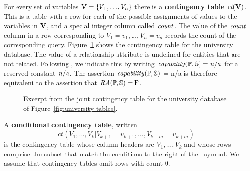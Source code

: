 \documentclass{sig-alternate-2013}
\newcommand{\ct}{\mathit{ct}}
\begin{document}
For every set of variables $\set{V} = \{\V_{1}$,$\ldots,\V_{n} \}$ there is a \textbf{contingency table} $\ct(\set{V})$. %
This is a table with a row for each of the possible assignments of values to the variables in $\set{V}$, and a special integer column called $\qcount$. 
The value of the $\qcount$ column in a row 
corresponding to $V_{1} = v_{1},\ldots,V_{n} = v_{n}$ records the count of the 
corresponding query. 
Figure~\ref{fig:ct} shows the contingency table for the university database. 
The value of a relationship attribute is undefined for entities that are not related.
Following \cite{Russell2010}, %
we indicate this by writing 
$\it{capability(\P,\S)} = n/a $ for a reserved constant $\it{n/a}$. 
The assertion $\it{capability(\P,\S)}$ = n/a is therefore equivalent to the assertion that $\ra(\P,\S) = \false$.
\begin{figure}[htbp]
\begin{center}
\caption{Excerpt from the joint contingency table for the university database of Figure~\ref{fig:university-tables}. 
\label{fig:ct}}
\end{center}
\end{figure}
A \textbf{conditional contingency table}, written $$\ct(V_{1},\ldots,V_{k}|V_{k+1} = v_{k+1},\ldots, V_{k+m} = v_{k+m})$$
is the contingency table whose column headers are $V_{1},\ldots,V_{k}$ and whose rows comprise the subset that match the conditions to the right of the $\vert$ symbol.  %
We assume that contingency tables omit rows with count 0.
%
\end{document}
